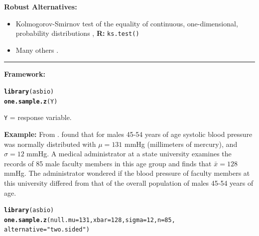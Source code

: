 \documentclass[12pt,english]{article}\usepackage[]{graphicx}\usepackage[table]{xcolor}
\makeatletter
\newcommand{\hlnum}[1]{\textcolor[rgb]{0.686,0.059,0.569}{#1}}%
\newcommand{\hlsng}[1]{\textcolor[rgb]{0.192,0.494,0.8}{#1}}%
\newcommand{\hldef}[1]{\textcolor[rgb]{0.345,0.345,0.345}{#1}}%
\newcommand{\hlkwc}[1]{\textcolor[rgb]{0.333,0.667,0.333}{#1}}%
\newcommand{\hlkwd}[1]{\textcolor[rgb]{0.737,0.353,0.396}{\textbf{#1}}}%
\newenvironment{kframe}{%
 \def\at@end@of@kframe{}%
 \ifinner\ifhmode%
  \def\at@end@of@kframe{\end{minipage}}%
  \begin{minipage}{\columnwidth}%
 \fi\fi%
 \def\FrameCommand##1{\hskip\@totalleftmargin \hskip-\fboxsep
 \colorbox{shadecolor}{##1}\hskip-\fboxsep
     \hskip-\linewidth \hskip-\@totalleftmargin \hskip\columnwidth}%
 \MakeFramed {\advance\hsize-\width
   \@totalleftmargin\z@ \linewidth\hsize
   \@setminipage}}%
 {\par\unskip\endMakeFramed%
 \at@end@of@kframe}
\newenvironment{knitrout}{}{} %
\makeatother
\begin{document}
\vspace{0.2in}
\noindent \textbf{Robust Alternatives:}
\begin{small}
\begin{itemize}
\item Kolmogorov-Smirnov test of the equality of continuous, one-dimensional, probability distributions \citep{kolmogorov1933, smirnov1948}, \textbf{R:} \texttt{ks.test()}
\vspace{-.1in}
\item Many others \citep[see][]{wilcox2012, hollander2013}.
\end{itemize}
\end{small}
\vspace{0.1in}
\par\noindent\rule{.9\textwidth}{0.4pt}
\begin{tcolorbox}[colback=yellow!50!red!25!white,colbacktitle=yellow!50!red,colframe=black!75!white,title=\textbf{R:} One Sample $z$-Test]

\textbf{Framework:}\\
\vspace{-.2in}
\begin{knitrout}
\color{fgcolor}\begin{kframe}
\begin{alltt}
\hlkwd{library}\hldef{(asbio)}
\hlkwd{one.sample.z}\hldef{(Y)}
\end{alltt}
\end{kframe}
\end{knitrout}
\vspace{-.1in}

\texttt{Y} = response variable.
\vspace{0.1in}

\textbf{Example:} From \citep[][pp 206-207]{aho2014}.  \citet{port2000} found that for males 45-54 years of age systolic  blood pressure was normally distributed with $\mu= 131$ mmHg (millimeters of mercury), and $\sigma = 12$ mmHg.  A medical administrator at a state university examines the records of 85 male faculty members in this age group and finds that $\bar{x} = 128$ mmHg.   The administrator wondered if the blood pressure of faculty members at this university differed from that of the overall population of males 45-54 years of age.
\vspace{-.1in}
\begin{knitrout}
\color{fgcolor}\begin{kframe}
\begin{alltt}
\hlkwd{library}\hldef{(asbio)}
\hlkwd{one.sample.z}\hldef{(}\hlkwc{null.mu} \hldef{=} \hlnum{131}\hldef{,} \hlkwc{xbar} \hldef{=} \hlnum{128}\hldef{,} \hlkwc{sigma} \hldef{=} \hlnum{12}\hldef{,} \hlkwc{n} \hldef{=} \hlnum{85}\hldef{,}
             \hlkwc{alternative} \hldef{=} \hlsng{"two.sided"}\hldef{)}
\end{alltt}
\end{kframe}
\end{knitrout}
\end{tcolorbox}
\end{document}
